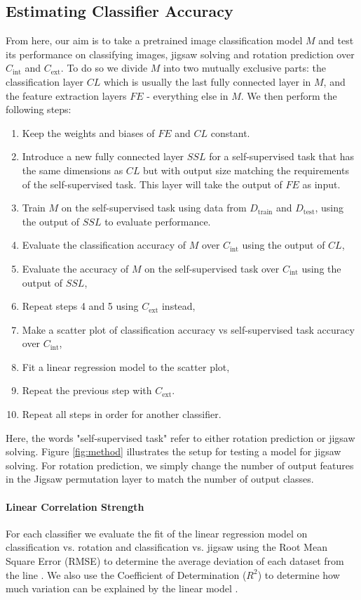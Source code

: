 \documentclass{article}
\begin{document}
\subsection{Estimating Classifier Accuracy}
From here, our aim is to take a pretrained image classification model $M$ and test its performance on classifying images, jigsaw solving and rotation prediction over $C_\text{int}$ and $C_\text{ext}$. To do so we divide $M$ into two mutually exclusive parts: the classification layer $CL$ which is usually the last fully connected layer in $M$, and the feature extraction layers $FE$ - everything else in $M$. We then perform the following steps:
\begin{enumerate}
  \item Keep the weights and biases of $FE$ and $CL$ constant.
  \item Introduce a new fully connected layer $SSL$ for a self-supervised task that has the same dimensions as $CL$ but with output size matching the requirements of the self-supervised task. This layer will take the output of $FE$ as input.
  \item Train $M$ on the self-supervised task using data from $D_\text{train}$ and $D_\text{test}$, using the output of $SSL$ to evaluate performance.
  \item Evaluate the classification accuracy of $M$ over $C_\text{int}$ using the output of $CL$,
  \item Evaluate the accuracy of $M$ on the self-supervised task over $C_\text{int}$ using the output of $SSL$,
  \item Repeat steps 4 and 5 using $C_\text{ext}$ instead,
  \item Make a scatter plot of classification accuracy vs self-supervised task accuracy over $C_\text{int}$,
  \item Fit a linear regression model to the scatter plot,
  \item Repeat the previous step with $C_\text{ext}$.
  \item Repeat all steps in order for another classifier.
\end{enumerate}
Here, the words "self-supervised task" refer to either rotation prediction or jigsaw solving. Figure \ref{fig:method} illustrates the setup for testing a model for jigsaw solving. For rotation prediction, we simply change the number of output features in the Jigsaw permutation layer to match the number of output classes.

\paragraph{Linear Correlation Strength} For each classifier we evaluate the fit of the linear regression model on classification vs. rotation and classification vs. jigsaw using the Root Mean Square Error (RMSE) to determine the average deviation of each dataset from the line \cite{chai2014root}. We also use the Coefficient of Determination ($R^2$) to determine how much variation can be explained by the linear model \cite{nagelkerke1991note}.
\end{document}
